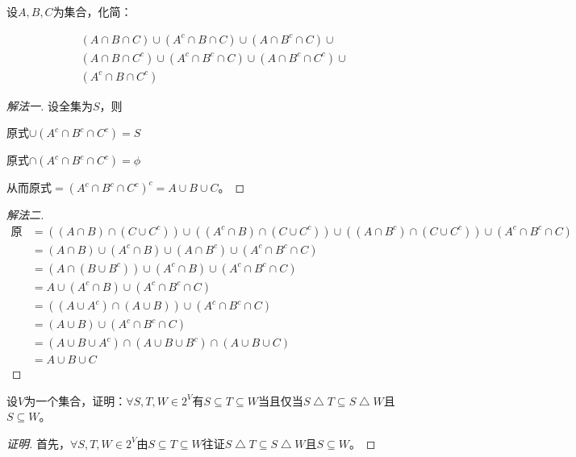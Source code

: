 \documentclass{article}
\begin{document}
\begin{CJK}{UTF8}{gbsn}
\begin{Exercise}
  设$A,B,C$为集合，化简：

  \begin{equation*}
    \begin{split}
     & (A\cap B \cap C)\cup(A^c\cap B \cap C)\cup(A\cap B^c \cap C)\cup \\
     & (A\cap B \cap C^c)\cup(A^c\cap B^c \cap C)\cup(A\cap B^c \cap C^c)\cup \\
     & (A^c\cap B \cap C^c)
    \end{split}
  \end{equation*}
\end{Exercise}
\begin{proof}[解法一]
设全集为$S$，则

原式$\cup (A^c\cap B^c \cap C^c)=S$

原式$\cap (A^c\cap B^c \cap C^c)=\phi$


从而原式$=(A^c\cap B^c \cap C^c)^c =A\cup B\cup C$。
\end{proof}
\begin{proof}[解法二]
  \begin{align*}
    \text{原式}&=((A\cap B)\cap(C\cup C^c))\cup ((A^c\cap B)\cap (C\cup C^c)) \cup ((A\cap B^c)\cap (C\cup C^c)) \cup (A^c\cap B^c \cap C)\\
  &=(A\cap B)\cup (A^c\cap B) \cup (A\cap B^c) \cup (A^c\cap B^c \cap C)\\
    &=(A\cap (B\cup B^c))\cup (A^c\cap B)  \cup (A^c\cap B^c \cap C)\\
    &=A\cup (A^c\cap B)  \cup (A^c\cap B^c \cap C)\\
    &=((A\cup A^c)\cap (A\cup B))  \cup (A^c\cap B^c \cap C)\\
    &=(A\cup B)  \cup (A^c\cap B^c \cap C)\\
    &=(A\cup B\cup A^c)  \cap  (A\cup B\cup B^c)\cap (A\cup B \cup C)\\
    &=A\cup B\cup C
\end{align*}
\end{proof}
\begin{Exercise}
  设$V$为一个集合，证明：$\forall S,T,W \in 2^V$有$S \subseteq T \subseteq W$当且仅当$S \bigtriangleup T \subseteq S \bigtriangleup W$且$S \subseteq W$。
\end{Exercise}
\begin{proof}[证明]
  首先，$\forall S,T,W \in 2^V$由$S \subseteq T \subseteq W$往证$S \bigtriangleup T \subseteq S \bigtriangleup W$且$S \subseteq W$。


\end{proof}
\end{CJK}
\end{document}
